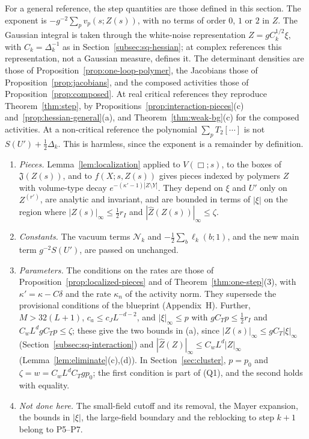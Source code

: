 \begin{remark}\label{rem:source-free}
For a general reference, the step quantities are those defined in this section. The exponent is $-g^{-2}\sum_pv_p(s;Z(s))$, with no terms of order $0$, $1$ or $2$ in $Z$. The Gaussian integral is taken through the white-noise representation $Z=gC_k^{1/2}\xi$, with $C_k=\Delta_k^{-1}$ as in Section~\ref{subsec:sq-hessian}; at complex references this representation, not a Gaussian measure, defines it. The determinant densities are those of Proposition~\ref{prop:one-loop-polymer}, the Jacobians those of Proposition~\ref{prop:jacobians}, and the composed activities those of Proposition~\ref{prop:composed}. At real critical references they reproduce Theorem~\ref{thm:step}, by Propositions~\ref{prop:interaction-pieces}(c) and~\ref{prop:hessian-general}(a), and Theorem~\ref{thm:weak-bg}(c) for the composed activities. At a non-critical reference the polynomial $\sum_pT_2[\cdots]$ is not $S(U')+\frac12\Delta_k$. This is harmless, since the exponent is a remainder by definition.
\end{remark}

\begin{remark}\label{rem:step-quantities-output}
\begin{enumerate}[label=(\alph*)]
\item \emph{Pieces.} Lemma~\ref{lem:localization} applied to $V(\Box;s)$, to the boxes of $\mathfrak J(Z(s))$, and to $f(X;s,Z(s))$ gives pieces indexed by polymers $Z$ with volume-type decay $e^{-(\kappa'-1)|Z\setminus Y|}$. They depend on $\xi$ and $U'$ only on $Z^{(r')}$, are analytic and invariant, and are bounded in terms of $|\xi|$ on the region where $|Z(s)|_\infty\le\frac12r_I$ and $|\hat Z(Z(s))|_\infty\le\zeta$.
\item \emph{Constants.} The vacuum terms $\mathcal N_k$ and $-\frac12\sum_b\ell_k(b;1)$, and the new main term $g^{-2}S(U')$, are passed on unchanged.
\item \emph{Parameters.} The conditions on the rates are those of Proposition~\ref{prop:localized-pieces} and of Theorem~\ref{thm:one-step}(3), with $\kappa'=\kappa-C\delta$ and the rate $\kappa_n$ of the activity norm. They supersede the provisional conditions of the blueprint (Appendix~H). Further, $M>32(L+1)$, $c_a\le c_JL^{-d-2}$, and $|\xi|_\infty\le p$ with $gC_Tp\le\frac12r_I$ and $C_wL^dgC_Tp\le\zeta$; these give the two bounds in (a), since $|Z(s)|_\infty\le gC_T|\xi|_\infty$ (Section~\ref{subsec:sq-interaction}) and $|\hat Z(Z)|_\infty\le C_wL^d|Z|_\infty$ (Lemma~\ref{lem:eliminate}(c),(d)). In Section~\ref{sec:cluster}, $p=p_0$ and $\zeta=w=C_wL^dC_Tgp_0$; the first condition is part of (Q1), and the second holds with equality.
\item \emph{Not done here.} The small-field cutoff and its removal, the Mayer expansion, the bounds in $|\xi|$, the large-field boundary and the reblocking to step $k+1$ belong to P5--P7.
\end{enumerate}
\end{remark}
